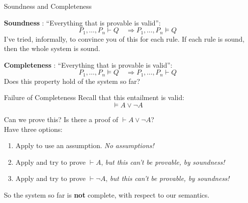 \documentclass[xetex,aspectratio=169,14pt,hyperref={pdfpagelabels=true,pdflang={en-GB}}]{beamer}
\begin{document}



\begin{frame}
  {Soundness and Completeness}

  \textbf{Soundness} : ``Everything that is provable is valid'':
  \begin{displaymath}
    P_1, \dots, P_n \vdash Q \quad \Rightarrow P_1, \dots, P_n \models Q
  \end{displaymath}
  I've tried, informally, to convince you of this for each rule. If
  each rule is sound, then the whole system is sound.

  \bigskip
  \pause

  \textbf{Completeness} : ``Everything that is provable is valid'':
  \begin{displaymath}
    P_1, \dots, P_n \models Q \quad \Rightarrow P_1, \dots, P_n \vdash Q
  \end{displaymath}
  Does this property hold of the system so far?
\end{frame}

\begin{frame}
  {Failure of Completeness}
  Recall that this entailment is valid:
  \begin{displaymath}
    \models A \lor \lnot A
  \end{displaymath}

  \bigskip

  Can we prove this? \pause Is there a proof of
  $\vdash A \lor \lnot A$? \\ \pause
  Have three options:
  \begin{enumerate}
  \item Apply  to use an assumption. \pause\emph{No assumptions!}\pause
  \item Apply  and try to prove $\vdash A$, \pause\emph{but
      this can't be provable, by soundness!}\pause
  \item Apply  and try to prove $\vdash \lnot A$,
    \pause\emph{but this can't be provable, by soundness!}\pause
  \end{enumerate}
  So the system so far is {\bf not} complete, with respect to our
  semantics.
\end{frame}
\end{document}

